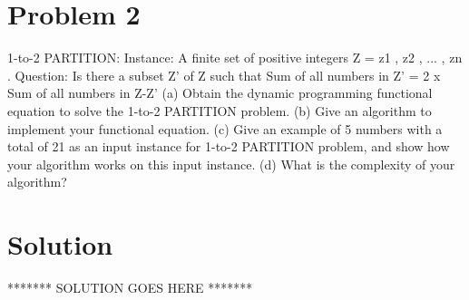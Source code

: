 
\section*{Problem 2}
    1-to-2 PARTITION:
    Instance: A finite set of positive integers Z = { z1 , z2 , ... , zn }.
    Question: Is there a subset Z' of Z such that
    Sum of all numbers in Z' = 2 x Sum of all numbers in Z-Z'
    (a) Obtain the dynamic programming functional equation to solve the 1-to-2 PARTITION problem.
    (b) Give an algorithm to implement your functional equation.
    (c) Give an example of 5 numbers with a total of 21 as an input instance for 1-to-2 PARTITION problem, and show how your algorithm works on this input instance.
    (d) What is the complexity of your algorithm?

\section*{Solution}
******* SOLUTION GOES HERE *******